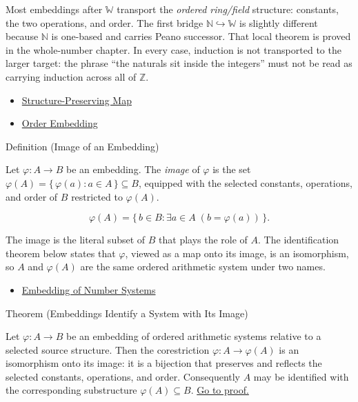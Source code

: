 \begin{remark*}[Interpretation]
Most embeddings after $\mathbb{W}$ transport the \emph{ordered ring/field}
structure: constants, the two operations, and order. The first bridge
$\mathbb{N}\hookrightarrow\mathbb{W}$ is slightly different because
$\mathbb{N}$ is one-based and carries Peano successor. That local theorem is
proved in the whole-number chapter. In every case, induction is not transported
to the larger target: the phrase ``the naturals sit inside the integers'' must
not be read as carrying induction across all of $\mathbb{Z}$.
\end{remark*}
\begin{dependencies}
\begin{itemize}
  \item \hyperref[def:structure-preserving-map]{Structure-Preserving Map}
  \item \hyperref[def:order-embedding]{Order Embedding}
\end{itemize}
\end{dependencies}
\begin{definitionbox}{Definition (Image of an Embedding)}
\begin{definition}
\label{def:image-of-embedding}
Let $\varphi:A\to B$ be an embedding. The \emph{image} of $\varphi$ is the set $\varphi(A)=\{\,\varphi(a) : a\in A\,\}\subseteq B$, equipped with the selected constants, operations, and order of $B$ restricted to $\varphi(A)$.
\end{definition}
\end{definitionbox}
\begin{remark*}
\[
\varphi(A)=\{\,b\in B:\exists a\in A\;(b=\varphi(a))\,\}.
\]
\end{remark*}
\begin{remark*}[Interpretation]
The image is the literal subset of $B$ that plays the role of $A$. The identification theorem below states that $\varphi$, viewed as a map onto its image, is an isomorphism, so $A$ and $\varphi(A)$ are the same ordered arithmetic system under two names.
\end{remark*}
\begin{dependencies}
\begin{itemize}
  \item \hyperref[def:number-system-embedding]{Embedding of Number Systems}
\end{itemize}
\end{dependencies}
\begin{theorembox}{Theorem (Embeddings Identify a System with Its Image)}
\begin{theorem}
\label{thm:embedding-identifies-with-image}
Let $\varphi:A\to B$ be an embedding of ordered arithmetic systems relative to
a selected source structure. Then the corestriction $\varphi:A\to\varphi(A)$
is an isomorphism onto its image: it is a bijection that preserves and reflects
the selected constants, operations, and order. Consequently $A$ may be
identified with the corresponding substructure $\varphi(A)\subseteq B$.
\hyperref[prf:embedding-identifies-with-image]{Go to proof.}
\end{theorem}
\end{theorembox}
